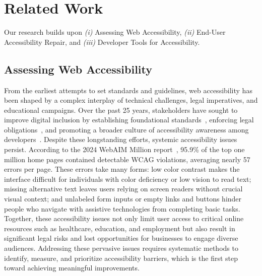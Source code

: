 \section{Related Work}
\label{lit_review}

\begin{highlight}
{

Our research builds upon {\em (i)} Assessing Web Accessibility, {\em (ii)} End-User Accessibility Repair, and {\em (iii)} Developer Tools for Accessibility.

\subsection{Assessing Web Accessibility}
From the earliest attempts to set standards and guidelines, web accessibility has been shaped by a complex interplay of technical challenges, legal imperatives, and educational campaigns. Over the past 25 years, stakeholders have sought to improve digital inclusion by establishing foundational standards~\cite{chisholm2001web, caldwell2008web}, enforcing legal obligations~\cite{sierkowski2002achieving, yesilada2012understanding}, and promoting a broader culture of accessibility awareness among developers~\cite{sloan2006contextual, martin2022landscape, pandey2023blending}. 
Despite these longstanding efforts, systemic accessibility issues persist. According to the 2024 WebAIM Million report~\cite{webaim2024}, 95.9\% of the top one million home pages contained detectable WCAG violations, averaging nearly 57 errors per page. 
These errors take many forms: low color contrast makes the interface difficult for individuals with color deficiency or low vision to read text; missing alternative text leaves users relying on screen readers without crucial visual context; and unlabeled form inputs or empty links and buttons hinder people who navigate with assistive technologies from completing basic tasks. 
Together, these accessibility issues not only limit user access to critical online resources such as healthcare, education, and employment but also result in significant legal risks and lost opportunities for businesses to engage diverse audiences. Addressing these pervasive issues requires systematic methods to identify, measure, and prioritize accessibility barriers, which is the first step toward achieving meaningful improvements.

}
\end{highlight}
